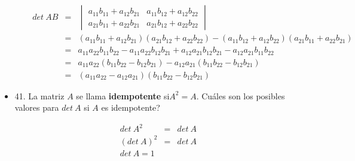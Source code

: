 \documentclass[12pt]{article}
\theoremstyle{plain}
\theoremstyle{definition}
\begin{document}
\begin{itemize}
\begin{enumerate}
        \begin{eqnarray*}
        det\ AB&=&\begin{vmatrix}a_{11}b_{11}+a_{12}b_{21} & a_{11}b_{12}+a_{12}b_{22}\\
        a_{21}b_{11}+a_{22}b_{21}&a_{21}b_{12}+a_{22}b_{22}\end{vmatrix}\\
        &=&(a_{11}b_{11}+a_{12}b_{21})(a_{21}b_{12}+a_{22}b_{22})-(a_{11}b_{12}+a_{12}b_{22})(a_{21}b_{11}+a_{22}b_{21})\\
        &=&a_{11}a_{22}b_{11}b_{22}-a_{11}a_{22}b_{12}b_{21}+a_{12}a_{21}b_{12}b_{21}-a_{12}a_{21}b_{11}b_{22}\\
        &=&a_{11}a_{22}(b_{11}b_{22}-b_{12}b_{21})-a_{12}a_{21}(b_{11}b_{22}-b_{12}b_{21})\\
        &=&(a_{11}a_{22}-a_{12}a_{21})(b_{11}b_{22}-b_{12}b_{21})
        \end{eqnarray*}
    \end{enumerate}
    \item 41.  La matriz $A$ se llama \textbf{idempotente} si$A^2=A$. \textquestiondown Cuáles son los posibles valores para $det\ A$ si $A$ es idempotente?
    
    \begin{eqnarray*}
    det\ A^2&=&det\ A\\
    (det\ A)^2&=&det\ A\\
    det\ A=1
    \end{eqnarray*}
    
\end{itemize}
\end{document}
